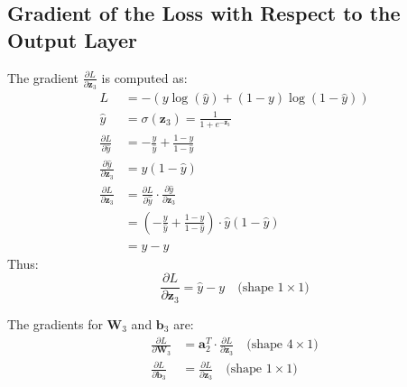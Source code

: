 \begin{notechapter}
\subsection{Gradient of the Loss with Respect to the Output Layer}
The gradient \(\frac{\partial L}{\partial \bm{z}_3}\) is computed as:
\begin{align*}
    L &= -\left( y \log(\hat{y}) + (1 - y) \log(1 - \hat{y}) \right) \\
    \hat{y} &= \sigma(\bm{z}_3) = \frac{1}{1 + e^{-\bm{z}_3}} \\
    \frac{\partial L}{\partial \hat{y}} &= -\frac{y}{\hat{y}} +
    \frac{1 - y}{1 - \hat{y}} \\
    \frac{\partial \hat{y}}{\partial \bm{z}_3} &= \hat{y} (1 - \hat{y}) \\
    \frac{\partial L}{\partial \bm{z}_3} &= \frac{\partial L}{\partial \hat{y}}
    \cdot \frac{\partial \hat{y}}{\partial \bm{z}_3} \\
    &= \left( -\frac{y}{\hat{y}} + \frac{1 - y}{1 - \hat{y}} \right)
    \cdot \hat{y} (1 - \hat{y}) \\
    &= \hat{y} - y
\end{align*}
Thus:
\[
\frac{\partial L}{\partial \bm{z}_3} = \hat{y} - y \quad
\text{(shape } 1 \times 1\text{)}
\]

\begin{center}
\end{center}

The gradients for \(\bm{W}_3\) and \(\bm{b}_3\) are:
\begin{align*}
    \frac{\partial L}{\partial \bm{W}_3} &= \bm{a}_2^T \cdot
    \frac{\partial L}{\partial \bm{z}_3} \quad
    \text{(shape } 4 \times 1\text{)} \\
    \frac{\partial L}{\partial \bm{b}_3} &= \frac{\partial L}{\partial \bm{z}_3}
    \quad \text{(shape } 1 \times 1\text{)}
\end{align*}


\end{notechapter}
